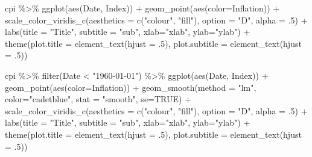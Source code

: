 \documentclass[
]{article}
\newenvironment{Shaded}{\begin{snugshade}}{\end{snugshade}}
\newcommand{\AttributeTok}[1]{\textcolor[rgb]{0.77,0.63,0.00}{#1}}
\newcommand{\ConstantTok}[1]{\textcolor[rgb]{0.00,0.00,0.00}{#1}}
\newcommand{\DecValTok}[1]{\textcolor[rgb]{0.00,0.00,0.81}{#1}}
\newcommand{\FunctionTok}[1]{\textcolor[rgb]{0.00,0.00,0.00}{#1}}
\newcommand{\NormalTok}[1]{#1}
\newcommand{\SpecialCharTok}[1]{\textcolor[rgb]{0.00,0.00,0.00}{#1}}
\newcommand{\StringTok}[1]{\textcolor[rgb]{0.31,0.60,0.02}{#1}}
\begin{document}
\begin{Shaded}
\begin{Highlighting}[]
\NormalTok{cpi }\SpecialCharTok{\%\textgreater{}\%} 
  \FunctionTok{ggplot}\NormalTok{(}\FunctionTok{aes}\NormalTok{(Date, Index)) }\SpecialCharTok{+} \FunctionTok{geom\_point}\NormalTok{(}\FunctionTok{aes}\NormalTok{(}\AttributeTok{color=}\NormalTok{Inflation)) }\SpecialCharTok{+} 
  \FunctionTok{scale\_color\_viridis\_c}\NormalTok{(}\AttributeTok{aesthetics =} \FunctionTok{c}\NormalTok{(}\StringTok{"colour"}\NormalTok{, }\StringTok{"fill"}\NormalTok{), }\AttributeTok{option =} \StringTok{"D"}\NormalTok{, }\AttributeTok{alpha =}\NormalTok{ .}\DecValTok{5}\NormalTok{) }\SpecialCharTok{+} 
  \FunctionTok{labs}\NormalTok{(}\AttributeTok{title =} \StringTok{"Title"}\NormalTok{, }\AttributeTok{subtitle =} \StringTok{"sub"}\NormalTok{, }\AttributeTok{xlab=}\StringTok{"xlab"}\NormalTok{, }\AttributeTok{ylab=}\StringTok{"ylab"}\NormalTok{) }\SpecialCharTok{+} 
  \FunctionTok{theme}\NormalTok{(}\AttributeTok{plot.title =} \FunctionTok{element\_text}\NormalTok{(}\AttributeTok{hjust =}\NormalTok{ .}\DecValTok{5}\NormalTok{), }\AttributeTok{plot.subtitle =} \FunctionTok{element\_text}\NormalTok{(}\AttributeTok{hjust =}\NormalTok{ .}\DecValTok{5}\NormalTok{))}
\end{Highlighting}
\end{Shaded}

\begin{Shaded}
\begin{Highlighting}[]
\NormalTok{cpi }\SpecialCharTok{\%\textgreater{}\%} 
  \FunctionTok{filter}\NormalTok{(Date }\SpecialCharTok{\textless{}} \StringTok{"1960{-}01{-}01"}\NormalTok{) }\SpecialCharTok{\%\textgreater{}\%} 
  \FunctionTok{ggplot}\NormalTok{(}\FunctionTok{aes}\NormalTok{(Date, Index)) }\SpecialCharTok{+} \FunctionTok{geom\_point}\NormalTok{(}\FunctionTok{aes}\NormalTok{(}\AttributeTok{color=}\NormalTok{Inflation)) }\SpecialCharTok{+} 
  \FunctionTok{geom\_smooth}\NormalTok{(}\AttributeTok{method =} \StringTok{"lm"}\NormalTok{, }\AttributeTok{color=}\StringTok{"cadetblue"}\NormalTok{, }\AttributeTok{stat =} \StringTok{"smooth"}\NormalTok{, }\AttributeTok{se=}\ConstantTok{TRUE}\NormalTok{) }\SpecialCharTok{+}
  \FunctionTok{scale\_color\_viridis\_c}\NormalTok{(}\AttributeTok{aesthetics =} \FunctionTok{c}\NormalTok{(}\StringTok{"colour"}\NormalTok{, }\StringTok{"fill"}\NormalTok{), }\AttributeTok{option =} \StringTok{"D"}\NormalTok{, }\AttributeTok{alpha =}\NormalTok{ .}\DecValTok{5}\NormalTok{) }\SpecialCharTok{+} 
  \FunctionTok{labs}\NormalTok{(}\AttributeTok{title =} \StringTok{"Title"}\NormalTok{, }\AttributeTok{subtitle =} \StringTok{"sub"}\NormalTok{, }\AttributeTok{xlab=}\StringTok{"xlab"}\NormalTok{, }\AttributeTok{ylab=}\StringTok{"ylab"}\NormalTok{) }\SpecialCharTok{+} 
  \FunctionTok{theme}\NormalTok{(}\AttributeTok{plot.title =} \FunctionTok{element\_text}\NormalTok{(}\AttributeTok{hjust =}\NormalTok{ .}\DecValTok{5}\NormalTok{), }\AttributeTok{plot.subtitle =} \FunctionTok{element\_text}\NormalTok{(}\AttributeTok{hjust =}\NormalTok{ .}\DecValTok{5}\NormalTok{))}
\end{Highlighting}
\end{Shaded}
\end{document}

